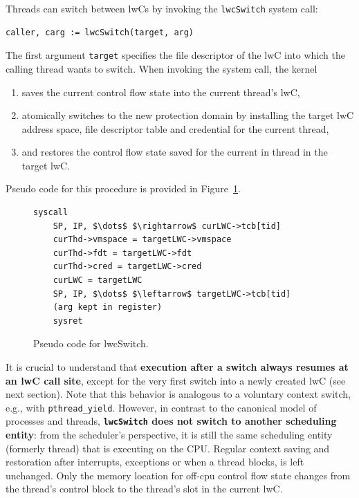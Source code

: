 \documentclass[10pt,twocolumn,a4paper]{article}
\begin{document}
Threads can switch between lwCs by invoking the \lstinline{lwcSwitch} system call:

\begin{lstlisting}[style=syscallinline]
  caller, carg := lwcSwitch(target, arg) 
\end{lstlisting}

The first argument \lstinline{target} specifies the file descriptor of the lwC into which the calling thread wants to switch.
When invoking the system call, the kernel
\begin{enumerate}[nosep,label=(\alph*)]
\item saves the current control flow state into the current thread's lwC,
\item atomically switches to the new protection domain by installing the target lwC address space, file descriptor table and credential for the current thread,
\item and restores the control flow state saved for the current in thread in the target lwC.
\end{enumerate}
Pseudo code for this procedure is provided in Figure~\ref{design:fig:switchpseudocode}.
\cite{lwckernelrepo,lwcpaper}

\begin{figure}[b] %
  \begin{lstlisting}[basicstyle=\footnotesize\ttfamily,mathescape,frame=single,linewidth=0.9\linewidth,belowskip=0pt,aboveskip=0pt,xleftmargin=0.05\linewidth]
    syscall
    SP, IP, $\dots$ $\rightarrow$ curLWC->tcb[tid]
    curThd->vmspace = targetLWC->vmspace
    curThd->fdt = targetLWC->fdt
    curThd->cred = targetLWC->cred
    curLWC = targetLWC
    SP, IP, $\dots$ $\leftarrow$ targetLWC->tcb[tid]
    (arg kept in register)
    sysret  
  \end{lstlisting}
  \caption{Pseudo code for lwcSwitch.}
  \label{design:fig:switchpseudocode}
\end{figure}

It is crucial to understand that \textbf{execution after a switch always resumes at an lwC call site}, except for the very first switch into a newly created lwC (see next section).
Note that this behavior is analogous to a voluntary context switch, e.g., with \lstinline{pthread_yield}.
However, in contrast to the canonical model of processes and threads, \textbf{\lstinline{lwcSwitch} does not switch to another scheduling entity}:
from the scheduler's perspective, it is still the same scheduling entity (formerly thread) that is executing on the CPU.
Regular context saving and restoration after interrupts, exceptions or when a thread blocks, is left unchanged.
Only the memory location for off-cpu control flow state changes from the thread's control block to the thread's slot in the current lwC.
\cite{lwckernelrepo}
\end{document}
